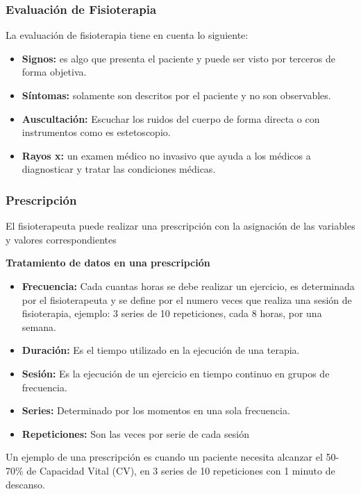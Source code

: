 \documentclass[12pt]{article}
\begin{document}
\subsubsection{Evaluación de Fisioterapia}

La evaluación de fisioterapia tiene en cuenta lo siguiente:

\begin{itemize}
    \item \textbf{Signos:} es algo que presenta el paciente y puede ser visto por terceros de forma objetiva.
    \item \textbf{Síntomas:} solamente son descritos por el paciente y no son observables. 
    \item \textbf{Auscultación:} Escuchar los ruidos del cuerpo de forma directa o con instrumentos como es estetoscopio.
    \item \textbf{Rayos x:} un examen médico no invasivo que ayuda a los médicos a diagnosticar y tratar las condiciones médicas. 
\end{itemize}


\subsubsection{Prescripción}

El fisioterapeuta puede realizar una prescripción con la asignación de las variables y  valores correspondientes


\textbf{Tratamiento de datos en una prescripción}

\begin{itemize}
    \item \textbf{Frecuencia:} Cada cuantas horas se debe realizar un ejercicio, es determinada por el fisioterapeuta y se define por el numero veces que realiza una sesión de fisioterapia, ejemplo: 3 series de 10 repeticiones, cada 8 horas, por una semana.
    \item \textbf{Duración:} Es el tiempo utilizado en la ejecución de una terapia.
    \item \textbf{Sesión:} Es la ejecución de un ejercicio en tiempo continuo en grupos de frecuencia.
    \item \textbf{Series:} Determinado por los momentos en una sola frecuencia.
    \item \textbf{Repeticiones:} Son las veces por serie de cada sesión
\end{itemize}
    
Un ejemplo de una prescripción es cuando un paciente necesita alcanzar el 50-70\% de Capacidad Vital (CV), en 3 series de 10 repeticiones con 1 minuto de descanso.
\end{document}
